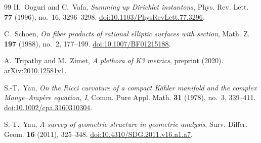 \begin{thebibliography}{99}
H.~Ooguri and C.~Vafa,
\emph{Summing up Dirichlet instantons},
Phys. Rev. Lett. \textbf{77} (1996), no.~16, 3296--3298.
\href{https://doi.org/10.1103/PhysRevLett.77.3296}{doi:10.1103/PhysRevLett.77.3296}.


C.~Schoen,
\emph{On fiber products of rational elliptic surfaces with section},
Math. Z. \textbf{197} (1988), no.~2, 177--199.
\href{https://doi.org/10.1007/BF01215188}{doi:10.1007/BF01215188}.


A.~Tripathy and M.~Zimet,
\emph{A plethora of K3 metrics}, preprint (2020).\newline
\href{https://arxiv.org/abs/2010.12581v1}{arXiv:2010.12581v1}.


S.-T.~Yau,
\emph{On the Ricci curvature of a compact K\"ahler manifold and the
complex Monge--Amp\`ere equation, I},
Comm. Pure Appl. Math. \textbf{31} (1978), no.~3, 339--411.
\href{https://doi.org/10.1002/cpa.3160310304}{doi:10.1002/cpa.3160310304}.

S.-T.~Yau,
\emph{A survey of geometric structure in geometric analysis},
Surv. Differ. Geom. \textbf{16} (2011), 325--348.
\href{https://doi.org/10.4310/SDG.2011.v16.n1.a7}{doi:10.4310/SDG.2011.v16.n1.a7}.
\end{thebibliography}
